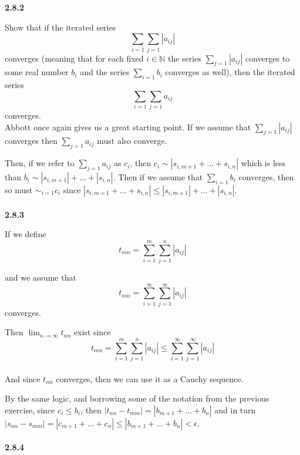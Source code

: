 \textbf{2.8.2}

Show that if the iterated series
$$
\sum_{i=1} \sum_{j=1} \left| a_{ij} \right|
$$
converges (meaning that for each fixed $i\in\mathbb{N}$ the series $\sum_{j=1} |a_{ij}|$ converges
to some real number $b_i$ and the series $\sum_{i=1} b_i$ converges as well),
then the iterated series
$$
\sum_{i=1} \sum_{j=1} a_{ij}
$$
converges.
\\

Abbott once again gives us a great starting point.
If we assume that $\sum_{j=1} |a_{ij}|$ converges then $\sum_{j=1} a_{ij}$ must also converge.

Then, if we refer to $\sum_{j=1} a_{ij}$ as $c_i$, then $c_i \sim |s_{i,m+1} + \ldots + s_{i,n}|$
which is less than $b_i \sim |s_{i,m+1}| + \ldots + |s_{i,n}|$.
Then if we assume that $\sum_{i=1} b_i$ converges, then so must $\sim_{i=1} c_i$ since
$|s_{i,m+1} + \ldots + s_{i,n}| \leq |s_{i,m+1}| + \ldots + |s_{i,n}|$.
\\~\\


\textbf{2.8.3}

If we define
$$
t_{mn} = \sum^{m}_{i=1} \sum^{n}_{j=1} |a_{ij}|
$$

and we assume that
$$
t_{mn} = \sum^{\infty}_{i=1} \sum^{\infty}_{j=1} |a_{ij}|
$$
converges.

Then $\lim_{n\rightarrow\infty} t_{nn}$ exist since
$$
t_{mn} = \sum^{m}_{i=1} \sum^{n}_{j=1} |a_{ij}|
\leq
\sum^{\infty}_{i=1} \sum^{\infty}_{j=1} |a_{ij}|
$$
\\

And since $t_{nn}$ converges, then we can use it as a Cauchy sequence.

By the same logic, and borrowing some of the notation from the previous exercise,
since $c_i \leq b_i$, then $|t_{nn} - t_{mm}| = |b_{m+1} + \ldots + b_n|$
and in turn $|s_{nn} - s_{mm}| = |c_{m+1} +\ldots + c_{n}| \leq |b_{m+1} + \ldots + b_n| < \epsilon$.
\\~\\



\textbf{2.8.4}